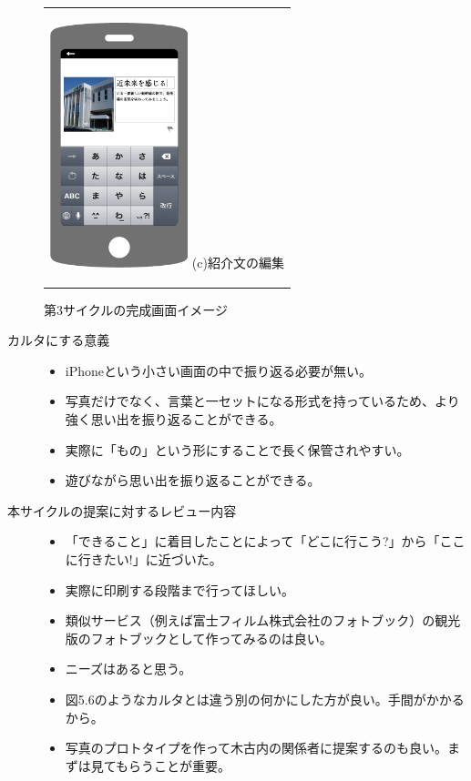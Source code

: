 \begin{figure}[htbp]
\begin{center}
\begin{tabular}{c}
      \begin{minipage}{0.33\hsize}
        \begin{center}
\includegraphics[width=4cm, bb=0 0 320 548]{appIdea3.png}
          \hspace{1cm} (c)紹介文の編集
        \end{center}
      \end{minipage}

    \end{tabular}
    \caption{第3サイクルの完成画面イメージ}
    \label{fig:lena}
  \end{center}
\end{figure}

\begin{description}
\item[カルタにする意義]\mbox{}
 \begin{itemize}
 \item iPhoneという小さい画面の中で振り返る必要が無い。
 \item 写真だけでなく、言葉と一セットになる形式を持っているため、より強く思い出を振り返ることができる。
 \item 実際に「もの」という形にすることで長く保管されやすい。
 \item 遊びながら思い出を振り返ることができる。
 \end{itemize}
\item[本サイクルの提案に対するレビュー内容]\mbox{}
 \begin{itemize}
 \item 「できること」に着目したことによって「どこに行こう?」から「ここに行きたい!」に近づいた。
 \item 実際に印刷する段階まで行ってほしい。
 \item 類似サービス（例えば富士フィルム株式会社のフォトブック）の観光版のフォトブックとして作ってみるのは良い。
 \item ニーズはあると思う。
 \item 図5.6のようなカルタとは違う別の何かにした方が良い。手間がかかるから。
 \item 写真のプロトタイプを作って木古内の関係者に提案するのも良い。まずは見てもらうことが重要。
 \end{itemize}
\end{description}


